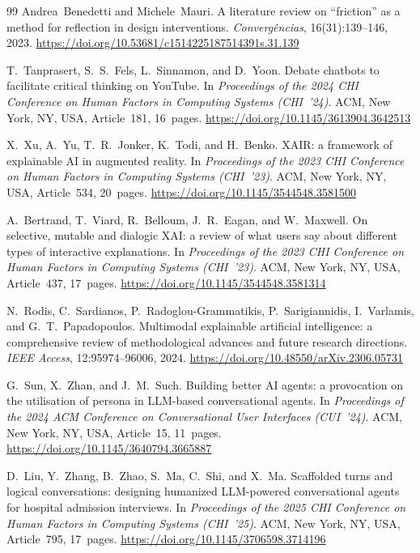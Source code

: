 \documentclass[sigconf,screen]{acmart}
\begin{document}
\begin{thebibliography}{99}
Andrea~Benedetti and Michele~Mauri.
\newblock A literature review on ``friction'' as a method for reflection in design
interventions.
\newblock \emph{Converg\^{e}ncias}, 16(31):139--146, 2023.
\newblock \url{https://doi.org/10.53681/c1514225187514391s.31.139}

T.~Tanprasert, S.~S.~Fels, L.~Sinnamon, and D.~Yoon.
\newblock Debate chatbots to facilitate critical thinking on YouTube.
\newblock In \emph{Proceedings of the 2024 CHI Conference on Human Factors in
Computing Systems (CHI~'24)}. ACM, New York, NY, USA, Article~181, 16~pages.
\newblock \url{https://doi.org/10.1145/3613904.3642513}

X.~Xu, A.~Yu, T.~R.~Jonker, K.~Todi, and H.~Benko.
\newblock XAIR: a framework of explainable AI in augmented reality.
\newblock In \emph{Proceedings of the 2023 CHI Conference on Human Factors in
Computing Systems (CHI~'23)}. ACM, New York, NY, USA, Article~534, 20~pages.
\newblock \url{https://doi.org/10.1145/3544548.3581500}

A.~Bertrand, T.~Viard, R.~Belloum, J.~R.~Eagan, and W.~Maxwell.
\newblock On selective, mutable and dialogic XAI: a review of what users say about
different types of interactive explanations.
\newblock In \emph{Proceedings of the 2023 CHI Conference on Human Factors in
Computing Systems (CHI~'23)}. ACM, New York, NY, USA, Article~437, 17~pages.
\newblock \url{https://doi.org/10.1145/3544548.3581314}

N.~Rodis, C.~Sardianos, P.~Radoglou-Grammatikis, P.~Sarigiannidis, I.~Varlamis,
and G.~T.~Papadopoulos.
\newblock Multimodal explainable artificial intelligence: a comprehensive review of
methodological advances and future research directions.
\newblock \emph{IEEE Access}, 12:95974--96006, 2024.
\newblock \url{https://doi.org/10.48550/arXiv.2306.05731}

G.~Sun, X.~Zhan, and J.~M.~Such.
\newblock Building better AI agents: a provocation on the utilisation of persona in
LLM-based conversational agents.
\newblock In \emph{Proceedings of the 2024 ACM Conference on Conversational User
Interfaces (CUI~'24)}. ACM, New York, NY, USA, Article~15, 11~pages.
\newblock \url{https://doi.org/10.1145/3640794.3665887}

D.~Liu, Y.~Zhang, B.~Zhao, S.~Ma, C.~Shi, and X.~Ma.
\newblock Scaffolded turns and logical conversations: designing humanized
LLM-powered conversational agents for hospital admission interviews.
\newblock In \emph{Proceedings of the 2025 CHI Conference on Human Factors in
Computing Systems (CHI~'25)}. ACM, New York, NY, USA, Article~795, 17~pages.
\newblock \url{https://doi.org/10.1145/3706598.3714196}


\end{thebibliography}
\end{document}
